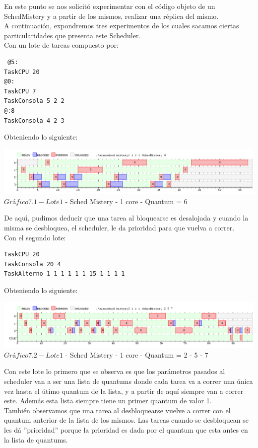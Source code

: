 \indent En este punto se nos solicit\'{o} experimentar con el c\'{o}digo objeto de un 
SchedMistery y a partir de los mismos, realizar una r\'{e}plica del mismo.\\

A continuaci\'{o}n, expondremos tres experimentos de los cuales sacamos ciertas particularidades que presenta este Scheduler.\\

Con un lote de tareas compuesto por:\\

\begin{verbatim}
 @5:
TaskCPU 20
@0:
TaskCPU 7
TaskConsola 5 2 2
@:8
TaskConsola 4 2 3
\end{verbatim}

Obteniendo lo siguiente:
\begin{center}
    	\includegraphics[width=450pt]{./Test/ej7_1.png}
	{$Gr$\'a$fico 7.1 - Lote 1$ - Sched Mistery - 1 core - Quantum = 6}	
 \end{center}
 
De aqu\'{\i}, pudimos deducir que una tarea al bloquearse es desalojada y cuando la misma se desbloquea, el scheduler, le da 
prioridad para que vuelva a correr.\\

Con el segundo lote:\\

\begin{verbatim}
TaskCPU 20
TaskConsola 20 4
TaskAlterno 1 1 1 1 1 1 15 1 1 1 1
\end{verbatim}

Obteniendo lo siguiente:
\begin{center}
    	\includegraphics[width=450pt]{./Test/ej7_2.png}
	{$Gr$\'a$fico 7.2 - Lote 1$ - Sched Mistery - 1 core - Quantum = 2 - 5 - 7}	
 \end{center}

Con este lote lo primero que se observa es que los par\'{a}metros pasados al scheduler van a ser una lista de quantums 
donde cada tarea va a correr una \'{u}nica vez hasta el \'{u}timo quantum de la lista, y a partir de aquí siempre van a correr este. Adem\'{a}s esta lista siempre 
tiene un primer quantum de valor 1.\\
Tambi\'{e}n observamos que una tarea al desbloquearse vuelve a correr con el quantum anterior de la lista de los mismos. 
Las tareas cuando se desbloquean se les d\'{a} ''prioridad'' porque la prioridad es dada por el quantum que esta antes en 
la lista de quantums.\\

